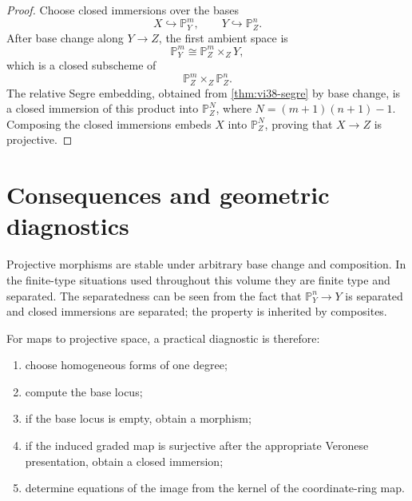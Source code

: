 \begin{proof}
Choose closed immersions over the bases
\[
  X\hookrightarrow\mathbb P^m_Y,
  \qquad
  Y\hookrightarrow\mathbb P^n_Z.
\]
After base change along \(Y\to Z\), the first ambient space is
\[
  \mathbb P^m_Y\cong\mathbb P^m_Z\times_Z Y,
\]
which is a closed subscheme of
\[
  \mathbb P^m_Z\times_Z\mathbb P^n_Z.
\]
The relative Segre embedding, obtained from \cref{thm:vi38-segre} by base change, is a closed immersion of this product into \(\mathbb P^N_Z\), where \(N=(m+1)(n+1)-1\).  Composing the closed immersions embeds \(X\) into \(\mathbb P^N_Z\), proving that \(X\to Z\) is projective.
\end{proof}



\section{Consequences and geometric diagnostics}
Projective morphisms are stable under arbitrary base change and composition.  In the finite-type situations used throughout this volume they are finite type and separated.  The separatedness can be seen from the fact that \(\mathbb P^n_Y\to Y\) is separated and closed immersions are separated; the property is inherited by composites.

For maps to projective space, a practical diagnostic is therefore:
\begin{enumerate}
\item choose homogeneous forms of one degree;
\item compute the base locus;
\item if the base locus is empty, obtain a morphism;
\item if the induced graded map is surjective after the appropriate Veronese presentation, obtain a closed immersion;
\item determine equations of the image from the kernel of the coordinate-ring map.
\end{enumerate}



